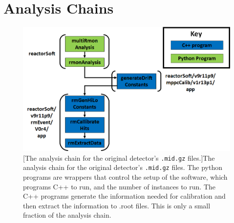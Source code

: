 
\chapter{Analysis Chains}

\begin{figure}[!h]
 \centering
 \includegraphics[width=\linewidth]{Chapter5/Figs/Raster/mattMurdocksChain.png}
 [The analysis chain for the original detector's \texttt{.mid.gz} files.]{The analysis chain for the original detector's \texttt{.mid.gz} files. The python programs are wrappers that control the setup of the software, which programs C++ to run, and the number of instances to run. The C++ programs generate the information needed for calibration and then extract the information to .root files. This is only a small fraction of the analysis chain.} 
 \label{fig:mattMurdocksChain}
\end{figure}
 
